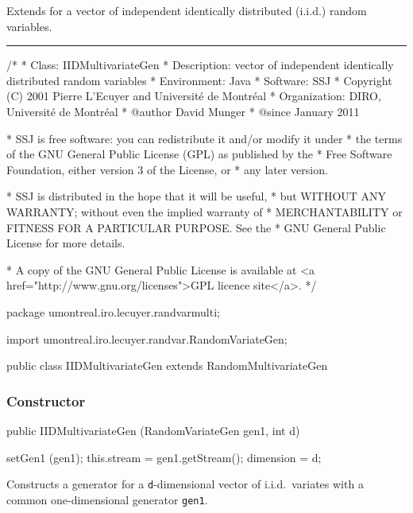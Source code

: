 
Extends  for a vector of independent identically distributed
(i.i.d.) random variables.


\bigskip\hrule

\begin{code}
\begin{hide}
/*
 * Class:        IIDMultivariateGen
 * Description:  vector of independent identically distributed random variables
 * Environment:  Java
 * Software:     SSJ 
 * Copyright (C) 2001  Pierre L'Ecuyer and Université de Montréal
 * Organization: DIRO, Université de Montréal
 * @author       David Munger
 * @since        January 2011

 * SSJ is free software: you can redistribute it and/or modify it under
 * the terms of the GNU General Public License (GPL) as published by the
 * Free Software Foundation, either version 3 of the License, or
 * any later version.

 * SSJ is distributed in the hope that it will be useful,
 * but WITHOUT ANY WARRANTY; without even the implied warranty of
 * MERCHANTABILITY or FITNESS FOR A PARTICULAR PURPOSE.  See the
 * GNU General Public License for more details.

 * A copy of the GNU General Public License is available at
   <a href="http://www.gnu.org/licenses">GPL licence site</a>.
 */
\end{hide}
package umontreal.iro.lecuyer.randvarmulti;
\begin{hide}
import umontreal.iro.lecuyer.randvar.RandomVariateGen;
\end{hide}

public class IIDMultivariateGen extends RandomMultivariateGen\begin{hide} {
\end{hide}\end{code}

\subsubsection*{Constructor}

\begin{code}

   public IIDMultivariateGen (RandomVariateGen gen1, int d) \begin{hide} {
      setGen1 (gen1);
      this.stream = gen1.getStream();
      dimension = d;
   } \end{hide}
\end{code}
\begin{tabb}
Constructs a generator for a \texttt{d}-dimensional vector of i.i.d.\ variates
with a common one-dimensional generator \texttt{gen1}.
\end{tabb}
\begin{htmlonly}
\end{htmlonly}


